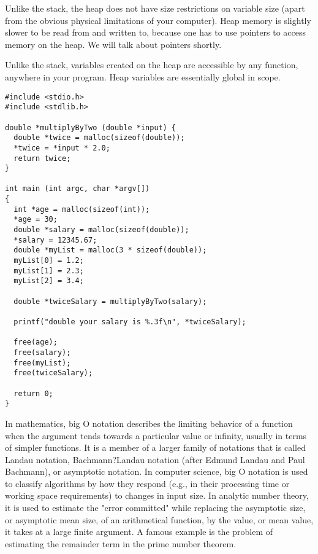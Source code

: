 \documentclass[9pt]{amsart}
\newcommand{\filldots}{\noindent \textbf {\textcolor {blue} {\dotfill}} }
\begin{document}
\begin{multicols}{2}
Unlike the stack, the heap does not have size restrictions on variable size (apart from the obvious physical limitations of your computer). Heap memory is slightly slower to be read from and written to, because one has to use pointers to access memory on the heap. We will talk about pointers shortly.

Unlike the stack, variables created on the heap are accessible by any function, anywhere in your program. Heap variables are essentially global in scope.

\begin{lstlisting}
#include <stdio.h>
#include <stdlib.h>

double *multiplyByTwo (double *input) {
  double *twice = malloc(sizeof(double));
  *twice = *input * 2.0;
  return twice;
}

int main (int argc, char *argv[])
{
  int *age = malloc(sizeof(int));
  *age = 30;
  double *salary = malloc(sizeof(double));
  *salary = 12345.67;
  double *myList = malloc(3 * sizeof(double));
  myList[0] = 1.2;
  myList[1] = 2.3;
  myList[2] = 3.4;

  double *twiceSalary = multiplyByTwo(salary);

  printf("double your salary is %.3f\n", *twiceSalary);

  free(age);
  free(salary);
  free(myList);
  free(twiceSalary);

  return 0;
}
\end{lstlisting}

\filldots 

\noindent {\textcolor {blue} {\em Big-O Time}} 
\noindent In mathematics, big O notation describes the limiting behavior of a function when the argument tends towards a particular value or infinity, usually in terms of simpler functions. It is a member of a larger family of notations that is called Landau notation, Bachmann?Landau notation (after Edmund Landau and Paul Bachmann), or asymptotic notation. In computer science, big O notation is used to classify algorithms by how they respond (e.g., in their processing time or working space requirements) to changes in input size. In analytic number theory, it is used to estimate the "error committed" while replacing the asymptotic size, or asymptotic mean size, of an arithmetical function, by the value, or mean value, it takes at a large finite argument. A famous example is the problem of estimating the remainder term in the prime number theorem.


\end{multicols}
\end{document}
